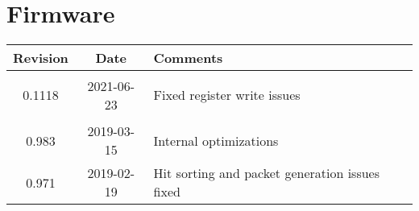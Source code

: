 \section{Firmware}
\begin{tabularx}{\textwidth}{|c|c|X|}
    \hline
    Revision & Date & Comments\\
    \hline\hline
    \hypertarget{fwrev}{0.1118} & 2021-06-23 & Fixed register write issues\\
    \hline
    {0.983} & 2019-03-15 & Internal optimizations\\
    \hline
    {0.971} & 2019-02-19 & Hit sorting and packet generation issues fixed\\
    \hline
\end{tabularx}